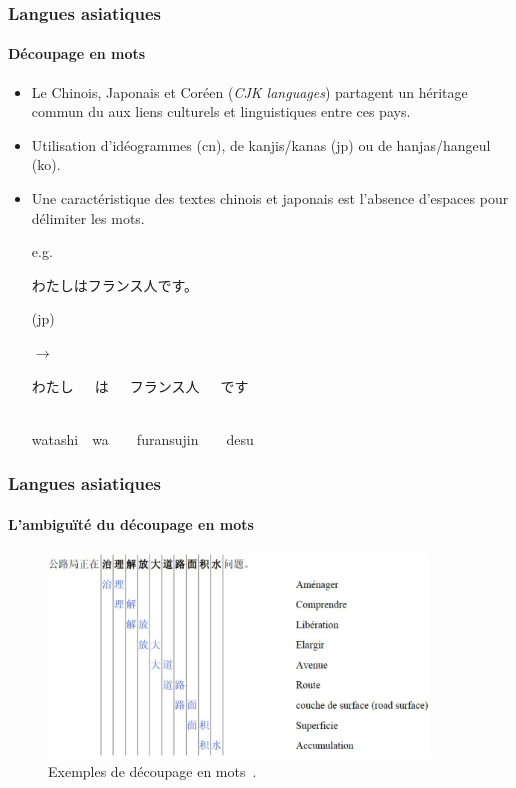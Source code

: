 \documentclass[12pt,aspectratio=43,dvipsnames,table]{beamer}
\begin{document}
\begin{frame}
    \frametitle{Langues asiatiques}
    \framesubtitle{Découpage en mots}
    \begin{itemize} \itemsep10pt
        \item Le Chinois, Japonais et Coréen (\textit{CJK languages}) partagent 
              un héritage commun du aux liens culturels et linguistiques entre 
              ces pays.
        \item Utilisation d'idéogrammes (cn), de kanjis/kanas (jp) ou de 
              hanjas/hangeul (ko).
        \item Une caractéristique des textes chinois et japonais est l'absence 
              d'espaces pour délimiter les mots.
        \item[e.g.] \begin{CJK}{UTF8}{min}わたしはフランス人です。\end{CJK} (jp)
        \item[$\to$] \begin{CJK}{UTF8}{min}わたし~~~は~~~フランス人~~~です\end{CJK} \\
                     watashi~~wa~~~~furansujin~~~~desu
    \end{itemize}
\end{frame}


\begin{frame}
    \frametitle{Langues asiatiques}
    \framesubtitle{L'ambiguïté du découpage en mots}
    \begin{figure}
    \centering
    \includegraphics[width=0.9\textwidth]{img/ambiguity.png}
    \caption{Exemples de découpage en mots~\cite{li2006}.}
    \end{figure}
\end{frame}
\end{document}
